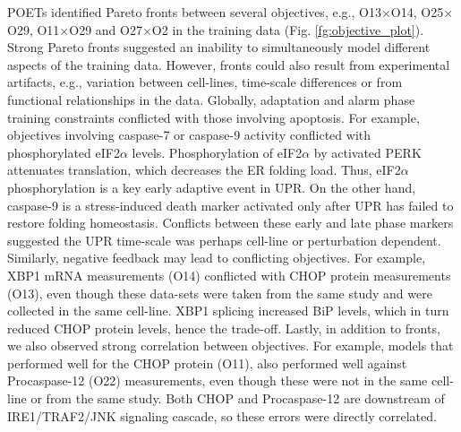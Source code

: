 \documentclass[12pt]{article}
\begin{document}
POETs identified Pareto fronts between several objectives, e.g., O13$\times$O14, O25$\times$O29, O11$\times$O29 and O27$\times$O2 in the training data  (Fig. \ref{fg:objective_plot}). Strong Pareto fronts suggested an inability to simultaneously model different aspects of the training data. However, fronts could also result from experimental artifacts, e.g., variation between cell-lines, time-scale differences or from functional relationships in the data. Globally, adaptation and alarm phase training constraints conflicted with those involving apoptosis. For example, objectives involving caspase-7 or caspase-9 activity conflicted with phosphorylated eIF2$\alpha$ levels. Phosphorylation of eIF2$\alpha$ by activated PERK attenuates translation, which decreases the ER folding load. Thus, eIF2$\alpha$ phosphorylation is a key early adaptive event in UPR. On the other hand, caspase-9 is a stress-induced death marker activated only after UPR has failed to restore folding homeostasis. Conflicts between these early and late phase markers suggested the UPR time-scale was perhaps cell-line or perturbation dependent. Similarly, negative feedback may lead to conflicting objectives. For example, XBP1 mRNA measurements (O14) conflicted with CHOP protein measurements (O13), even though these data-sets were taken from the same study and were collected in the same cell-line. XBP1 splicing increased BiP levels, which in turn reduced CHOP protein levels, hence the trade-off. Lastly, in addition to fronts, we also observed strong correlation between objectives. For example, models that performed well for the CHOP protein (O11), also performed well against Procaspase-12 (O22) measurements, even though these were not in the same cell-line or from the same study. Both CHOP and Procaspase-12 are downstream of IRE1/TRAF2/JNK signaling cascade, so these errors were directly correlated.

\end{document}
